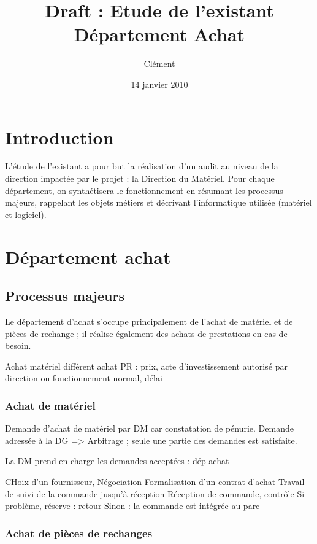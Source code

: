 \documentclass[a4paper]{article}
\title{Draft : Etude de l'existant\\Département Achat}
\author{Clément}
\date{14 janvier 2010}
\begin{document}
\maketitle

\section{Introduction}

L'étude de l'existant a pour but la réalisation d'un audit au niveau de la
direction impactée par le projet : la Direction du Matériel. Pour chaque
département, on synthétisera le fonctionnement en résumant les processus
majeurs, rappelant les objets métiers et décrivant l'informatique utilisée
(matériel et logiciel).


\section{Département achat}


\subsection{Processus majeurs}

Le département d'achat s'occupe principalement de l'achat de matériel et de
pièces de rechange ; il réalise également des achats de prestations en cas
de besoin.

Achat matériel différent achat PR : prix, acte d'investissement autorisé
par direction ou fonctionnement normal, délai


\subsubsection{Achat de matériel}

Demande d'achat de matériel par DM car constatation de pénurie. Demande
adressée à la DG => Arbitrage ; seule une partie des demandes est
satisfaite.

La DM prend en charge les demandes acceptées : dép achat

CHoix d'un fournisseur,
Négociation
Formalisation d'un contrat d'achat
Travail de suivi de la commande jusqu'à réception
Réception de commande, contrôle
Si problème, réserve : retour
Sinon : la commande est intégrée au parc


\subsubsection{Achat de pièces de rechanges}
\end{document}
